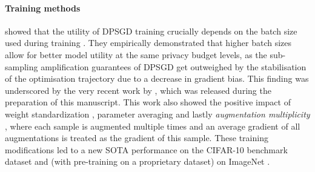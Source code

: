 \documentclass[nohyperref]{article}
\theoremstyle{plain}
\theoremstyle{definition}
\theoremstyle{remark}
\begin{document}
\paragraph{Training methods}
\citeauthor{dormann2021not} showed that the utility of \acs{DPSGD} training crucially depends on the batch size used during training \cite{dormann2021not}. They empirically demonstrated that higher batch sizes allow for better model utility at the same privacy budget levels, as the sub-sampling amplification guarantees of \acs{DPSGD} get outweighed by the stabilisation of the optimisation trajectory due to a decrease in gradient bias. This finding was underscored by the very recent work by \citeauthor{de2022unlocking}, which was released during the preparation of this manuscript. This work also showed the positive impact of weight standardization \cite{qiao2019micro}, parameter averaging \cite{polyak1992acceleration, tan2019efficientnet} and lastly \textit{augmentation multiplicity} \cite{fort2021drawing, hoffer2019augment, touvron2021training}, where each sample is augmented multiple times and an average gradient of all augmentations is treated as the gradient of this sample. These training modifications led to a new SOTA performance on the CIFAR-10 benchmark dataset \cite{krizhevsky2009learning} and (with pre-training on a proprietary dataset) on ImageNet \cite{deng2009imagenet}. 
\end{document}
